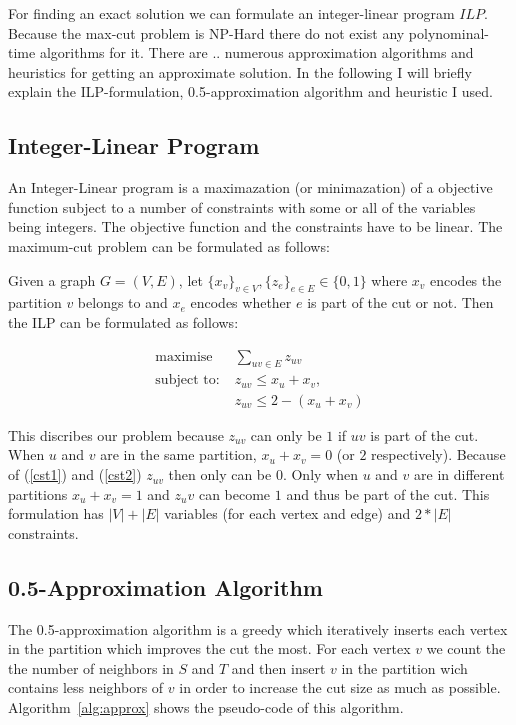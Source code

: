 \documentclass[twocolumn]{article}
\begin{document}
For finding an exact solution we can formulate an integer-linear program \(ILP\).
Because the max-cut problem is NP-Hard there do not exist any polynominal-time algorithms for it.
There are .. numerous approximation algorithms and heuristics for getting an approximate solution.
In the following I will briefly explain the ILP-formulation, 0.5-approximation algorithm and heuristic
I used.

\subsection{Integer-Linear Program}
An Integer-Linear program is a maximazation (or minimazation) of a objective function subject to a number of constraints with some or all of the variables being integers.
The objective function and the constraints have to be linear.
The maximum-cut problem can be formulated as follows:

Given a graph $G = (V, E)$, let $\{x_v\}_{v \in V}, \{z_e\}_{e \in E} \in \{0, 1\}$ where $x_v$ encodes the partition $v$ belongs to
and $x_e$ encodes whether $e$ is part of the cut or not.
Then the ILP can be formulated as follows:

\begin{align}
  \text{maximise} \; & \sum_{uv \in E} z_{uv} \\
  \text{subject to:} \; & z_{uv} \leq x_u + x_v, \label{cst1} \\
  & z_{uv} \leq 2 - (x_u + x_v) \label{cst2}
\end{align}

This discribes our problem because $z_{uv}$ can only be $1$ if $uv$ is part of the cut. 
When $u$ and $v$ are in the same partition, $x_u + x_v = 0$ (or $2$ respectively).
Because of (\ref{cst1}) and (\ref{cst2}) $z_{uv}$ then only can be $0$.
Only when $u$ and $v$ are in different partitions $x_u + x_v = 1$ and $z_uv$ can become
$1$ and thus be part of the cut.
This formulation has $|V| + |E|$ variables (for each vertex and edge) and $2 * |E|$ constraints.

\subsection{0.5-Approximation Algorithm}
\label{sct:pre_approx}
The 0.5-approximation algorithm is a greedy which iteratively inserts each vertex in the partition
which improves the cut the most. For each vertex $v$ we count the the number of neighbors in
$S$ and $T$ and then insert $v$ in the partition wich contains less neighbors of $v$ in order
to increase the cut size as much as possible. Algorithm~\ref{alg:approx} shows the pseudo-code
of this algorithm.
\end{document}
